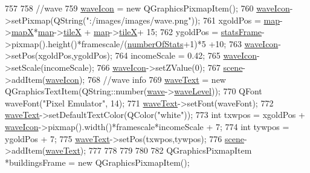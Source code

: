 \begin{DoxyCode}
757 
758     \textcolor{comment}{//wave}
759     \hyperlink{class_game_ade75481ee579a63670f6d7358919634a}{waveIcon} = \textcolor{keyword}{new} QGraphicsPixmapItem();
760     \hyperlink{class_game_ade75481ee579a63670f6d7358919634a}{waveIcon}->setPixmap(QString(\textcolor{stringliteral}{":/images/images/wave.png"}));
761     xgoldPos = \hyperlink{class_game_acef3a39fdf14be2c980b0dc11e7be402}{map}->\hyperlink{class_map_acfd20721da29a2e353598555e23e12f0}{mapX}*\hyperlink{class_game_acef3a39fdf14be2c980b0dc11e7be402}{map}->\hyperlink{class_map_af2aa425dd22aba483ae973c4a15fe934}{tileX} + \hyperlink{class_game_acef3a39fdf14be2c980b0dc11e7be402}{map}->\hyperlink{class_map_af2aa425dd22aba483ae973c4a15fe934}{tileX}+ 15;
762     ygoldPos = \hyperlink{class_game_a3b40718d348c0f12af63a3f428924ab4}{statsFrame}->pixmap().height()*framescale/(\hyperlink{class_game_af041d097dc2350360c7951e5a41bc48a}{numberOfStats}+1)*5 +10;
763     \hyperlink{class_game_ade75481ee579a63670f6d7358919634a}{waveIcon}->setPos(xgoldPos,ygoldPos);
764     incomeScale = 0.42;
765     \hyperlink{class_game_ade75481ee579a63670f6d7358919634a}{waveIcon}->setScale(incomeScale);
766     \hyperlink{class_game_ade75481ee579a63670f6d7358919634a}{waveIcon}->setZValue(0);
767     \hyperlink{class_game_a8119e3b9a632906c6808fa294b46a92a}{scene}->addItem(\hyperlink{class_game_ade75481ee579a63670f6d7358919634a}{waveIcon});
768     \textcolor{comment}{//wave info}
769     \hyperlink{class_game_ac33d078835536f2dc1af85ddbabd3a20}{waveText} = \textcolor{keyword}{new} QGraphicsTextItem(QString::number(\hyperlink{class_game_af9a4b49ad573785e961b29758c84fdd0}{wave}->\hyperlink{class_waves_abfdc18a5f2f185285173797c1c67c6f9}{waveLevel}));
770     QFont waveFont(\textcolor{stringliteral}{"Pixel Emulator"}, 14);
771     \hyperlink{class_game_ac33d078835536f2dc1af85ddbabd3a20}{waveText}->setFont(waveFont);
772     \hyperlink{class_game_ac33d078835536f2dc1af85ddbabd3a20}{waveText}->setDefaultTextColor(QColor(\textcolor{stringliteral}{"white"}));
773     \textcolor{keywordtype}{int} txwpos = xgoldPos + \hyperlink{class_game_ade75481ee579a63670f6d7358919634a}{waveIcon}->pixmap().width()*framescale*incomeScale + 7;
774     \textcolor{keywordtype}{int} tywpos = ygoldPos + 7;
775     \hyperlink{class_game_ac33d078835536f2dc1af85ddbabd3a20}{waveText}->setPos(txwpos,tywpos);
776     \hyperlink{class_game_a8119e3b9a632906c6808fa294b46a92a}{scene}->addItem(\hyperlink{class_game_ac33d078835536f2dc1af85ddbabd3a20}{waveText});
777 
778 
779 
780 
782     QGraphicsPixmapItem *buildingsFrame = \textcolor{keyword}{new} QGraphicsPixmapItem();

\end{DoxyCode}
